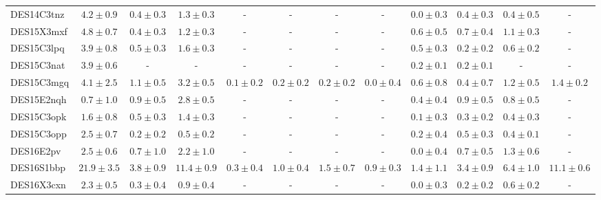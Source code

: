 \documentclass[fleqn,usenatbib,]{mnras}
\begin{document}
\begin{table}
\begin{tabular}{lccccccccccc}
DES14C3tnz  &    $4.2 \pm 0.9$ &  $0.4 \pm 0.3$ &   $1.3 \pm 0.3$ &              - &               - &              - &              - &  $0.0 \pm 0.3$ &   $0.4 \pm 0.3$ &   $0.4 \pm 0.5$ &               - \\
DES15X3mxf  &    $4.8 \pm 0.7$ &  $0.4 \pm 0.3$ &   $1.2 \pm 0.3$ &              - &               - &              - &              - &  $0.6 \pm 0.5$ &   $0.7 \pm 0.4$ &   $1.1 \pm 0.3$ &               - \\
DES15C3lpq  &    $3.9 \pm 0.8$ &  $0.5 \pm 0.3$ &   $1.6 \pm 0.3$ &              - &               - &              - &              - &  $0.5 \pm 0.3$ &   $0.2 \pm 0.2$ &   $0.6 \pm 0.2$ &               - \\
DES15C3nat  &    $3.9 \pm 0.6$ &              - &               - &              - &               - &              - &              - &  $0.2 \pm 0.1$ &   $0.2 \pm 0.1$ &               - &               - \\
DES15C3mgq  &    $4.1 \pm 2.5$ &  $1.1 \pm 0.5$ &   $3.2 \pm 0.5$ &  $0.1 \pm 0.2$ &   $0.2 \pm 0.2$ &  $0.2 \pm 0.2$ &  $0.0 \pm 0.4$ &  $0.6 \pm 0.8$ &   $0.4 \pm 0.7$ &   $1.2 \pm 0.5$ &   $1.4 \pm 0.2$ \\
DES15E2nqh  &    $0.7 \pm 1.0$ &  $0.9 \pm 0.5$ &   $2.8 \pm 0.5$ &              - &               - &              - &              - &  $0.4 \pm 0.4$ &   $0.9 \pm 0.5$ &   $0.8 \pm 0.5$ &               - \\
DES15C3opk  &    $1.6 \pm 0.8$ &  $0.5 \pm 0.3$ &   $1.4 \pm 0.3$ &              - &               - &              - &              - &  $0.1 \pm 0.3$ &   $0.3 \pm 0.2$ &   $0.4 \pm 0.3$ &               - \\
DES15C3opp  &    $2.5 \pm 0.7$ &  $0.2 \pm 0.2$ &   $0.5 \pm 0.2$ &              - &               - &              - &              - &  $0.2 \pm 0.4$ &   $0.5 \pm 0.3$ &   $0.4 \pm 0.1$ &               - \\
DES16E2pv   &    $2.5 \pm 0.6$ &  $0.7 \pm 1.0$ &   $2.2 \pm 1.0$ &              - &               - &              - &              - &  $0.0 \pm 0.4$ &   $0.7 \pm 0.5$ &   $1.3 \pm 0.6$ &               - \\
DES16S1bbp  &   $21.9 \pm 3.5$ &  $3.8 \pm 0.9$ &  $11.4 \pm 0.9$ &  $0.3 \pm 0.4$ &   $1.0 \pm 0.4$ &  $1.5 \pm 0.7$ &  $0.9 \pm 0.3$ &  $1.4 \pm 1.1$ &   $3.4 \pm 0.9$ &   $6.4 \pm 1.0$ &  $11.1 \pm 0.6$ \\
DES16X3cxn  &    $2.3 \pm 0.5$ &  $0.3 \pm 0.4$ &   $0.9 \pm 0.4$ &              - &               - &              - &              - &  $0.0 \pm 0.3$ &   $0.2 \pm 0.2$ &   $0.6 \pm 0.2$ &               - \\

\end{tabular}
\end{table}
\end{document}
